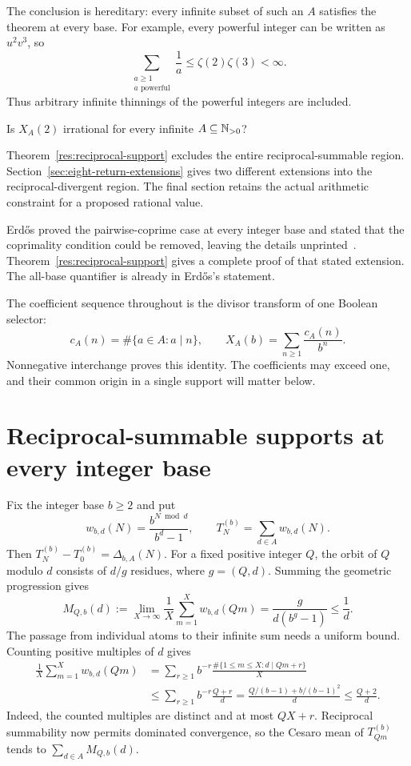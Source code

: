 \documentclass[11pt]{article}
\begin{document}
The conclusion is hereditary: every infinite subset of such an $A$
satisfies the theorem at every base.  For example, every powerful integer
can be written as $u^2v^3$, so
\[
 \sum_{\substack{a\ge1\\a\text{ powerful}}}\frac1a
 \le\zeta(2)\zeta(3)<\infty.
\]
Thus arbitrary infinite thinnings of the powerful integers are included.

\begin{problem}[Erd\H{o}s \#257]\label{res:problem}
Is $X_A(2)$ irrational for every infinite $A\subseteq\mathbb{N}_{>0}$?
\end{problem}
Theorem~\ref{res:reciprocal-support} excludes the entire
reciprocal-summable region.  Section~\ref{sec:eight-return-extensions}
gives two different extensions into the reciprocal-divergent region.
The final section retains the actual arithmetic constraint for a proposed
rational value.

Erd\H{o}s proved the pairwise-coprime case at every integer base and
stated that the coprimality condition could be removed, leaving the details
unprinted~\cite[p.~222]{erdos1968}.  Theorem~\ref{res:reciprocal-support}
gives a complete proof of that stated extension.  The all-base quantifier
is already in Erd\H{o}s's statement.

The coefficient sequence throughout is the divisor transform of one
Boolean selector:
\begin{equation}
 c_A(n)=\#\{a\in A:a\mid n\},\qquad
 X_A(b)=\sum_{n\ge1}\frac{c_A(n)}{b^n}.
 \label{eq:incidence}
\end{equation}
Nonnegative interchange proves this identity.  The coefficients may
exceed one, and their common origin in a single support will matter below.

\section{Reciprocal-summable supports at every integer base}
\label{sec:reciprocal-support}

Fix the integer base $b\ge2$ and put
\[
 w_{b,d}(N)=\frac{b^{N\bmod d}}{b^d-1},\qquad
 T_N^{(b)}=\sum_{d\in A}w_{b,d}(N).
\]
Then $T_N^{(b)}-T_0^{(b)}=\Delta_{b,A}(N)$.
For a fixed positive integer $Q$, the orbit of $Q$ modulo $d$ consists of
$d/g$ residues, where $g=(Q,d)$.  Summing the geometric progression gives
\begin{equation}
 M_{Q,b}(d):=\lim_{X\to\infty}\frac1X\sum_{m=1}^Xw_{b,d}(Qm)
 =\frac{g}{d(b^g-1)}\le\frac1d.
 \label{eq:gcd-orbit-mean}
\end{equation}
The passage from individual atoms to their infinite sum needs a uniform
bound.  Counting positive multiples of $d$ gives
\begin{align*}
 \frac1X\sum_{m=1}^Xw_{b,d}(Qm)
 &=\sum_{r\ge1}b^{-r}
       \frac{\#\{1\le m\le X:d\mid Qm+r\}}X\\
 &\le\sum_{r\ge1}b^{-r}\frac{Q+r}{d}
 =\frac{Q/(b-1)+b/(b-1)^2}{d}\le\frac{Q+2}{d}.
\end{align*}
Indeed, the counted multiples are distinct and at most $QX+r$.
Reciprocal summability now permits dominated convergence, so the Cesaro
mean of $T_{Qm}^{(b)}$ tends to $\sum_{d\in A}M_{Q,b}(d)$.
\end{document}
